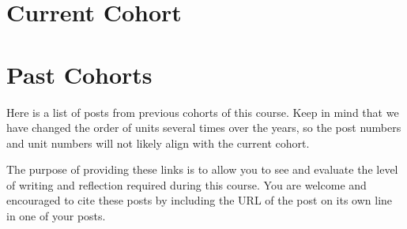 \documentclass[
]{book}
\begin{document}
\hypertarget{current-cohort}{%
\section*{Current Cohort}\label{current-cohort}}

\hypertarget{past-cohorts}{%
\section*{Past Cohorts}\label{past-cohorts}}

Here is a list of posts from previous cohorts of this course. Keep in mind that we have changed the order of units several times over the years, so the post numbers and unit numbers will not likely align with the current cohort.

The purpose of providing these links is to allow you to see and evaluate the level of writing and reflection required during this course. You are welcome and encouraged to cite these posts by including the URL of the post on its own line in one of your posts.

  
\end{document}
